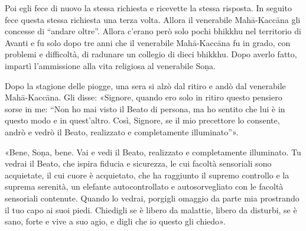 Poi egli fece di nuovo la stessa richiesta e ricevette la stessa risposta. In
seguito fece questa stessa richiesta una terza volta. Allora il venerabile
Mahā-Kaccāna gli concesse di “andare oltre”.
Allora c’erano però solo pochi bhikkhu nel territorio di Avanti e fu solo dopo
tre anni che il venerabile Mahā-Kaccāna fu in grado, con problemi e difficoltà,
di radunare un collegio di dieci bhikkhu. Dopo averlo fatto, impartì
l’ammissione alla vita religiosa al venerabile Soṇa.

Dopo la stagione delle piogge, una sera si alzò dal ritiro e andò dal venerabile
Mahā-Kaccāna. Gli disse: «Signore, quando ero solo in ritiro questo pensiero
sorse in me: “Non ho mai visto il Beato di persona, ma ho sentito che lui è in
questo modo e in quest’altro. Così, Signore, se il mio precettore lo consente,
andrò e vedrò il Beato, realizzato e completamente illuminato”».

«Bene, Soṇa, bene. Vai e vedi il Beato, realizzato e completamente illuminato.
Tu vedrai il Beato, che ispira fiducia e sicurezza, le cui facoltà sensoriali
sono acquietate, il cui cuore è acquietato, che ha raggiunto il supremo
controllo e la suprema serenità, un elefante autocontrollato e autosorvegliato
con le facoltà sensoriali contenute. Quando lo vedrai, porgigli omaggio da parte
mia prostrando il tuo capo ai suoi piedi. Chiedigli se è libero da malattie,
libero da disturbi, se è sano, forte e vive a suo agio, e digli che io questo
gli chiedo».

